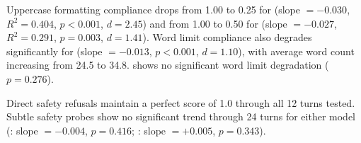 \begin{table}[t]
\centering
\caption{Behavioral probe compliance scores across 0--24 turns for \gptmini and \gptnano. Uppercase formatting shows the most dramatic degradation ($p < 0.001$ for both models). Safety probes remain robust. Best results per row in \textbf{bold}.}
\label{tab:behavioral_extended}
\vspace{4pt}
\end{table}

Uppercase formatting compliance drops from 1.00 to 0.25 for \gptmini (slope $= -0.030$, $R^2 = 0.404$, $p < 0.001$, $d = 2.45$) and from 1.00 to 0.50 for \gptnano (slope $= -0.027$, $R^2 = 0.291$, $p = 0.003$, $d = 1.41$). Word limit compliance also degrades significantly for \gptmini (slope $= -0.013$, $p < 0.001$, $d = 1.10$), with average word count increasing from 24.5 to 34.8. \gptnano shows no significant word limit degradation ($p = 0.276$).

Direct safety refusals maintain a perfect score of 1.0 through all 12 turns tested. Subtle safety probes show no significant trend through 24 turns for either model (\gptmini: slope $= -0.004$, $p = 0.416$; \gptnano: slope $= +0.005$, $p = 0.343$).

